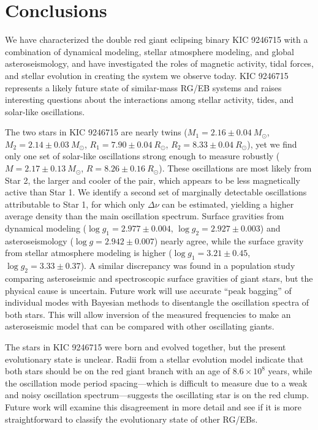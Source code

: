\section{Conclusions}\label{conclude}

We have characterized the double red giant eclipsing binary KIC 9246715 with a combination of dynamical modeling, stellar atmosphere modeling, and global asteroseismology, and have investigated the roles of magnetic activity, tidal forces, and stellar evolution in creating the system we observe today. KIC 9246715 represents a likely future state of similar-mass RG/EB systems and raises interesting questions about the interactions among stellar activity, tides, and solar-like oscillations.

The two stars in KIC 9246715 are nearly twins ($M_1 = 2.16 \pm 0.04\ M_{\odot}$, $M_2 = 2.14 \pm 0.03\ M_{\odot}$, $R_1 = 7.90 \pm 0.04 \ R_{\odot}$, $R_2 = 8.33 \pm 0.04 \ R_{\odot}$), yet we find only one set of solar-like oscillations strong enough to measure robustly ($M = 2.17 \pm 0.13 \ M_{\odot}$, $R = 8.26 \pm 0.16 \ R_{\odot}$). These oscillations are most likely from Star 2, the larger and cooler of the pair, which appears to be less magnetically active than Star 1. We identify a second set of marginally detectable oscillations attributable to Star 1, for which only $\Delta \nu$ can be estimated, yielding a higher average density than the main oscillation spectrum. Surface gravities from dynamical modeling ($\log g_1 = 2.977 \pm 0.004$, $\log g_2 = 2.927 \pm 0.003$) and asteroseismology ($\log g = 2.942 \pm 0.007$) nearly agree, while the surface gravity from stellar atmosphere modeling is higher ($\log g_1 = 3.21 \pm 0.45$, $\log g_2 = 3.33 \pm 0.37$). A similar discrepancy was found in a population study comparing asteroseismic and spectroscopic surface gravities of giant stars, but the physical cause is uncertain. Future work will use accurate ``peak bagging'' of individual modes with Bayesian methods to disentangle the oscillation spectra of both stars. This will allow inversion of the measured frequencies to make an asteroseismic model that can be compared with other oscillating giants.

The stars in KIC 9246715 were born and evolved together, but the present evolutionary state is unclear. Radii from a stellar evolution model indicate that both stars should be on the red giant branch with an age of $8.6 \times 10^8$ years, while the oscillation mode period spacing---which is difficult to measure due to a weak and noisy oscillation spectrum---suggests the oscillating star is on the red clump. Future work will examine this disagreement in more detail and see if it is more straightforward to classify the evolutionary state of other RG/EBs.

